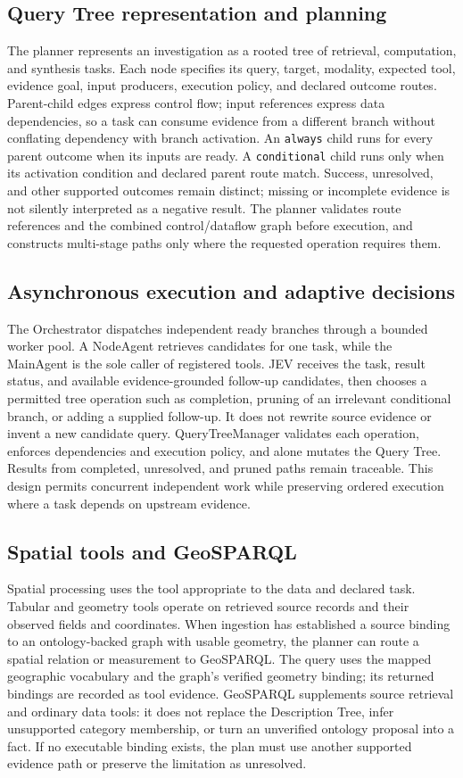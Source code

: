 \subsection{Query Tree representation and planning}
The planner represents an investigation as a rooted tree of retrieval, computation, and synthesis tasks. Each node specifies its query, target, modality, expected tool, evidence goal, input producers, execution policy, and declared outcome routes. Parent-child edges express control flow; input references express data dependencies, so a task can consume evidence from a different branch without conflating dependency with branch activation. An \texttt{always} child runs for every parent outcome when its inputs are ready. A \texttt{conditional} child runs only when its activation condition and declared parent route match. Success, unresolved, and other supported outcomes remain distinct; missing or incomplete evidence is not silently interpreted as a negative result. The planner validates route references and the combined control/dataflow graph before execution, and constructs multi-stage paths only where the requested operation requires them.

\subsection{Asynchronous execution and adaptive decisions}
The Orchestrator dispatches independent ready branches through a bounded worker pool. A NodeAgent retrieves candidates for one task, while the MainAgent is the sole caller of registered tools. JEV receives the task, result status, and available evidence-grounded follow-up candidates, then chooses a permitted tree operation such as completion, pruning of an irrelevant conditional branch, or adding a supplied follow-up. It does not rewrite source evidence or invent a new candidate query. QueryTreeManager validates each operation, enforces dependencies and execution policy, and alone mutates the Query Tree. Results from completed, unresolved, and pruned paths remain traceable. This design permits concurrent independent work while preserving ordered execution where a task depends on upstream evidence.

\subsection{Spatial tools and GeoSPARQL}
Spatial processing uses the tool appropriate to the data and declared task. Tabular and geometry tools operate on retrieved source records and their observed fields and coordinates. When ingestion has established a source binding to an ontology-backed graph with usable geometry, the planner can route a spatial relation or measurement to GeoSPARQL. The query uses the mapped geographic vocabulary and the graph's verified geometry binding; its returned bindings are recorded as tool evidence. GeoSPARQL supplements source retrieval and ordinary data tools: it does not replace the Description Tree, infer unsupported category membership, or turn an unverified ontology proposal into a fact. If no executable binding exists, the plan must use another supported evidence path or preserve the limitation as unresolved.

